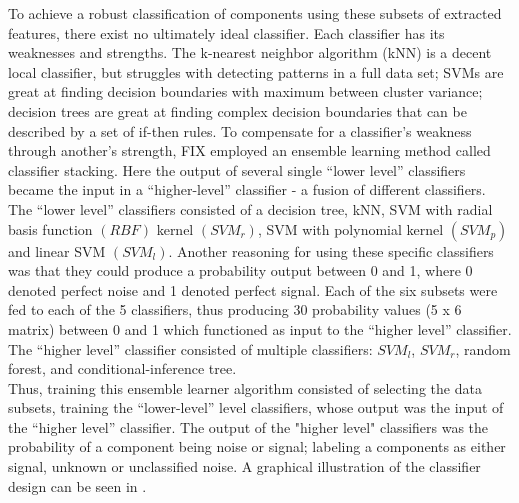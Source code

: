 To achieve a robust classification of components using these subsets of extracted features, there exist no ultimately ideal classifier. Each classifier has its weaknesses and strengths. The k-nearest neighbor algorithm (kNN) is a decent local classifier, but struggles with detecting patterns in a full data set; SVMs are great at finding decision boundaries with maximum between cluster variance; decision trees are great at finding complex decision boundaries that can be described by a set of if-then rules. To compensate for a classifier’s weakness through another’s strength, FIX employed an ensemble learning method called classifier stacking. Here the output of several single “lower level” classifiers became the input in a “higher-level” classifier - a fusion of different classifiers. The “lower level” classifiers consisted of a decision tree, kNN, SVM with radial basis function $(RBF)$ kernel $(SVM_r)$, SVM with polynomial kernel $(SVM_p)$ and linear SVM $(SVM_l)$. Another reasoning for using these specific classifiers was that they could produce a probability output between 0 and 1, where 0 denoted perfect noise and 1 denoted perfect signal. Each of the six subsets were fed to each of the 5 classifiers, thus producing 30 probability values (5 x 6 matrix) between 0 and 1 which functioned as input to the “higher level” classifier. The “higher level” classifier consisted of multiple classifiers: $SVM_l$, $SVM_r$, random forest, and conditional-inference tree. \\
Thus, training this ensemble learner algorithm consisted of selecting the data subsets, training the “lower-level” level classifiers, whose output was the input of the “higher level” classifier. The output of the "higher level" classifiers was the probability of a component being noise or signal; labeling a components as either signal, unknown or unclassified noise. A graphical illustration of the classifier design can be seen in . %

